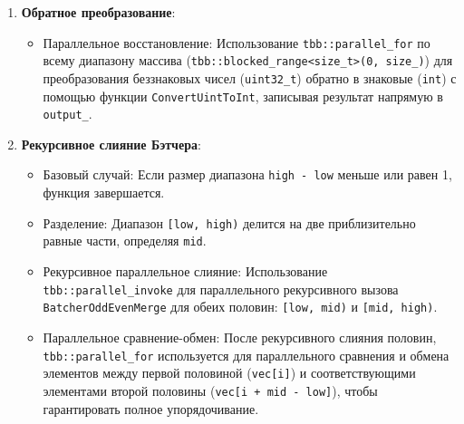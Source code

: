\documentclass[12pt,a4paper]{extarticle}
\begin{document}
\begin{enumerate}
    \item \textbf{Обратное преобразование}:
    \begin{itemize}
        \item Параллельное восстановление: Использование \texttt{tbb::parallel\_for} по всему диапазону массива (\texttt{tbb::blocked\_range<size\_t>(0, size\_)}) для преобразования беззнаковых чисел (\texttt{uint32\_t}) обратно в знаковые (\texttt{int}) с помощью функции \texttt{ConvertUintToInt}, записывая результат напрямую в \texttt{output\_}.
    \end{itemize}
    
    \item \textbf{Рекурсивное слияние Бэтчера}:
    \begin{itemize}
        \item Базовый случай: Если размер диапазона \texttt{high - low} меньше или равен 1, функция завершается.
        \item Разделение: Диапазон \texttt{[low, high)} делится на две приблизительно равные части, определяя \texttt{mid}.
        \item Рекурсивное параллельное слияние:
            Использование \texttt{tbb::parallel\_invoke} для параллельного рекурсивного вызова \texttt{BatcherOddEvenMerge} для обеих половин: \texttt{[low, mid)} и \texttt{[mid, high)}.
        \item Параллельное сравнение-обмен:
            После рекурсивного слияния половин, \texttt{tbb::parallel\_for} используется для параллельного сравнения и обмена элементов между первой половиной (\texttt{vec[i]}) и соответствующими элементами второй половины (\texttt{vec[i + mid - low]}), чтобы гарантировать полное упорядочивание.
    \end{itemize}
   
\end{enumerate}
\end{document}
